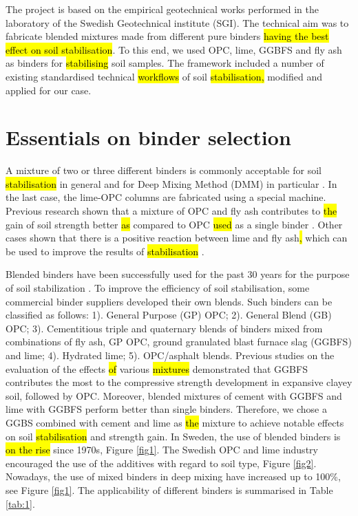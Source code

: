\documentclass[eprint,
]{actapoly}
\begin{document}
The project is based on the empirical geotechnical works performed in the laboratory of the Swedish Geotechnical institute (SGI). The technical aim was to fabricate blended mixtures made from different pure binders \hl{having the best effect on soil stabilisation}. To this end, we used OPC, lime, GGBFS and fly ash as binders for \hl{stabilising} soil samples. The framework included a number of existing standardised technical \hl{workflows} of soil \hl{stabilisation, }modified and applied for our case.

\section{Essentials on binder selection}
A mixture of two or three different binders is commonly acceptable for soil \hl{stabilisation} in general and for Deep Mixing Method (DMM) in particular \cite{BergmanLarsson,Naqshabandy,Paniagua}. In the last case, the lime-OPC columns are fabricated using a special machine. Previous research shown that a mixture of OPC and fly ash contributes to \hl{the} gain of soil strength better \hl{as} compared to OPC \hl{used} as a single binder \cite{Yaxuetal2022,Vukicevicetal}. Other cases shown that there is a positive reaction between lime and fly ash\hl{, }which can be used to improve the results of \hl{stabilisation} \cite{GoswamiSingh,Raoetal2008,Knapiketal2015}. 

Blended binders have been successfully used for the past 30 years for the purpose of soil stabilization \cite{Ghazy,Consolietal2019,Lindh2001,Leeetal2019,Filho,Yietal2014,LindhLemenkovaECES,Guetal2014,Yangetal2015}. To improve the efficiency of soil stabilisation, some commercial binder suppliers developed their own blends. Such binders can be classified as follows: 1). General Purpose (GP) OPC; 2). General Blend (GB) OPC; 3). Cementitious triple and quaternary blends of binders mixed from combinations of fly ash, GP OPC, ground granulated blast furnace slag (GGBFS) and lime; 4). Hydrated lime; 5). OPC/asphalt blends. Previous studies on the evaluation of the effects \hl{of} various \hl{mixtures} demonstrated \cite{ma15217798} that GGBFS contributes the most to the compressive strength development in expansive clayey soil, followed by OPC. Moreover, blended mixtures of cement with GGBFS and lime with GGBFS perform better than single binders. Therefore, we chose a GGBS combined with cement and lime as \hl{the} mixture to achieve notable effects on soil \hl{stabilisation} and strength gain. In Sweden, the use of blended binders is \hl{on the rise} since 1970s, Figure \ref{fig1}. The Swedish OPC and lime industry encouraged the use of the additives with regard to soil type, Figure \ref{fig2}. Nowadays, the use of mixed binders in deep mixing have increased up to 100\%, see Figure \ref{fig1}. The applicability of different binders is summarised in Table \ref{tab:1}. 
\end{document}
